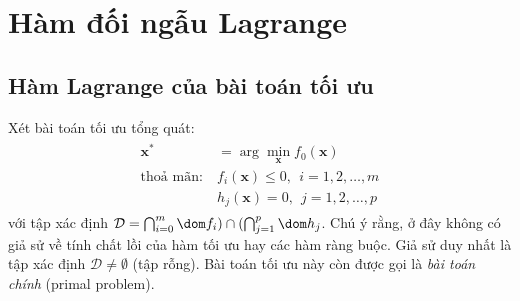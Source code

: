  
 
 
 
 
\section{Hàm đối ngẫu Lagrange}
\subsection{Hàm Lagrange của bài toán tối ưu}
Xét bài toán tối ưu tổng quát:
\begin{eqnarray} 
\label{eqn:18_lagrangian}
\begin{aligned}
\mathbf{x}^* &= \arg\min_{\mathbf{x}} f_0(\mathbf{x}) \\
\text{thoả mãn:}~ & f_i(\mathbf{x}) \leq 0, ~~ i = 1, 2, \dots, m\\ 
& h_j(\mathbf{x}) = 0, ~~ j = 1, 2, \dots, p 
\end{aligned}
\end{eqnarray} 
với tập xác định $\mathcal{D} = \bigcap_{i=0}^m \dom f_i) \cap (\bigcap_{j=1}^p \dom
h_j$. Chú ý rằng, ở đây không có giả sử về tính chất lồi của hàm tối ưu
hay các hàm ràng buộc. Giả sử duy nhất là tập xác định $\mathcal{D} \neq
\emptyset$ (tập rỗng). Bài toán tối ưu này còn được gọi là \textit{bài toán chính} ({primal problem}).


